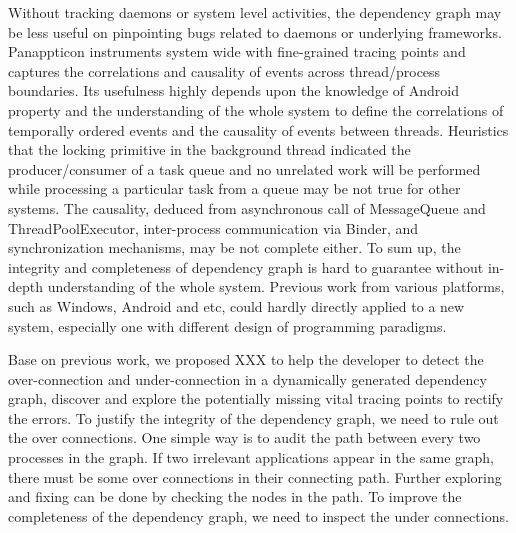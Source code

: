 Without tracking daemons or system level activities, the dependency graph may be less useful on pinpointing bugs related to daemons or underlying frameworks.
Panappticon instruments system wide with fine-grained tracing points and captures the correlations and causality of events across thread/process boundaries.
Its usefulness highly depends upon the knowledge of Android property and the understanding of the whole system to define the correlations of temporally ordered events and the causality of events between threads.
Heuristics that the locking primitive in the background thread indicated the producer/consumer of a task queue and no unrelated work will be performed while processing a particular task from a queue may be not true for other systems.
The causality, deduced from asynchronous call of MessageQueue and ThreadPoolExecutor, inter-process communication via Binder, and synchronization mechanisms, may be not complete either.
To sum up, the integrity and completeness of dependency graph is hard to guarantee without in-depth understanding of the whole system.
Previous work from various platforms, such as Windows, Android and etc, could hardly directly applied to a new system, especially one with different design of programming paradigms.
\par
Base on previous work, we proposed XXX to help the developer to detect the over-connection and under-connection in a dynamically generated dependency graph, discover and explore the potentially missing vital tracing points to rectify the errors. 
To justify the integrity of the dependency graph, we need to rule out the over connections.
One simple way is to audit the path between every two processes in the graph.
If two irrelevant applications appear in the same graph, there must be some over connections in their connecting path.
Further exploring and fixing can be done by checking the nodes in the path.
To improve the completeness of the dependency graph, we need to inspect the under connections.
%

